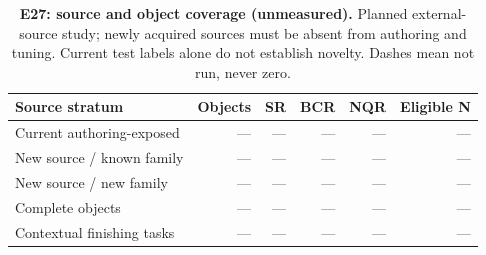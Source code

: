 \begin{table}[!ht]
\centering\small
\caption{\textbf{E27: source and object coverage (unmeasured).} Planned external-source study; newly acquired sources must be absent from authoring and tuning. Current test labels alone do not establish novelty. Dashes mean not run, never zero.}
\begin{tabularx}{\textwidth}{@{}Xrrrrr@{}}\toprule
Source stratum & Objects & SR & BCR & NQR & Eligible N\\\midrule
Current authoring-exposed & --- & --- & --- & --- & ---\\
New source / known family & --- & --- & --- & --- & ---\\
New source / new family & --- & --- & --- & --- & ---\\
Complete objects & --- & --- & --- & --- & ---\\
Contextual finishing tasks & --- & --- & --- & --- & ---\\
\bottomrule
\end{tabularx}
\end{table}
